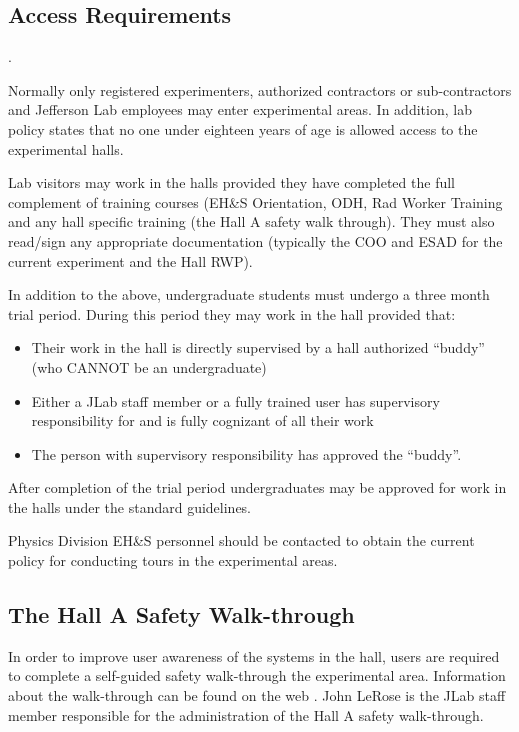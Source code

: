 \begin{safetyen}{10}{10}
\subsection{Access Requirements}.
\end{safetyen}

  Normally only registered experimenters, authorized contractors or
sub-contractors and Jefferson Lab employees may enter experimental
areas. In addition, lab policy states that no one under eighteen years
of age is allowed access to the experimental halls.

 Lab visitors may work in the halls provided they have completed the
 full complement of training courses (EH\&S Orientation, ODH, Rad
 Worker Training and any hall specific training (the Hall A safety
 walk through). They must also read/sign any appropriate documentation
 (typically the COO and ESAD for the current experiment and the Hall
 RWP).

 In addition to the above, undergraduate students must undergo a three
 month trial period. During this period they may work in the hall
 provided that:

\begin{itemize}
\item Their work in the hall is directly supervised by a hall
 authorized ``buddy'' (who CANNOT be an undergraduate)
\item Either a JLab staff member or a fully trained user has
 supervisory responsibility for and is fully cognizant of all their
 work
\item The person with supervisory responsibility has approved the
``buddy''.
\end{itemize}

After completion of the trial period undergraduates may be
approved for work in the halls under the standard guidelines. 

Physics Division EH\&S personnel should be contacted to obtain
the current policy for conducting tours in the experimental areas. 

\begin{safetyen}{10}{10}
\subsection{The Hall A Safety Walk-through}
\end{safetyen}

In order to improve user awareness of the systems in the hall,
users are required to complete a self-guided safety walk-through
the experimental area. Information about the walk-through can be
found on the web%
.
John LeRose is the JLab staff member responsible for the
administration of the Hall A safety walk-through.

